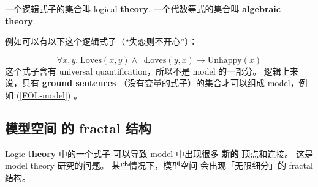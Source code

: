 \documentclass[12pt, orivec]{article}
\newcommand{\cc}[2]{#1}
\newcommand{\cc}[2]{#2}
\begin{document}
\cc{一个逻辑式子的集合叫 logical \textbf{theory}.  一个代数等式的集合叫 \textbf{algebraic theory}.
}{
A collection of logic formulas is called a logic \textbf{theory}.  A collection of algebraic equations is called an \textbf{algebraic theory}.}

\cc{例如可以有以下这个逻辑式子（``失恋则不开心''）：
}{
For example, you can have the following logic formula (``unrequited love $\Rightarrow$ unhappy''):}
\begin{equation}
\forall x,y. \; \mbox{Loves}(x,y) \wedge \neg \mbox{Loves}(y,x) \rightarrow \mbox{Unhappy}(x)
\end{equation}
\cc{这个式子含有 universal quantification，所以不是 model 的一部分。 逻辑上来说，只有 \textbf{ground sentences} （没有变量的式子）的集合才可以组成 model，例如 (\ref{FOL-model}) 。 
}{
This formula contains the universal quantification $\forall$, so it is not part of the model.  Logically, only a collection of \textbf{ground sentences} (formulas without variables) can form a model, such as (\ref{FOL-model}) .}

\subsection{\cc{模型空间 的 fractal 结构}{Fractal structure in the model space}}

\cc{Logic \textbf{theory} 中的一个式子 可以导致 model 中出现很多 \textbf{新的} 顶点和连接。 这是 model theory 研究的问题。  某些情况下，模型空间 会出现「无限细分」的 fractal 结构。 
}{
A formula in a logic \textbf{theory} can cause many \textbf{new} vertices and edges to appear in the model.  This is the study of model theory.  In some cases, the model space will have an ``infinitely subdivided'' fractal structure.}
\end{document}
